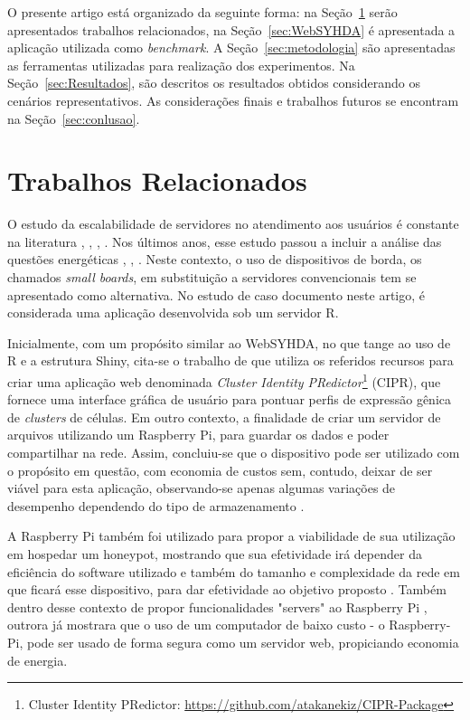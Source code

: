 \documentclass[12pt,english,brazil]{article}
\begin{document}
O presente artigo está organizado da seguinte forma: na Seção~\ref{sec:TrabalhosRelacionados} serão apresentados trabalhos relacionados, na Seção~\ref{sec:WebSYHDA} é apresentada a aplicação utilizada como \emph{benchmark}. A Seção~\ref{sec:metodologia} são apresentadas as ferramentas utilizadas para realização dos experimentos. Na Seção~\ref{sec:Resultados}, são descritos os resultados obtidos considerando os cenários representativos. As considerações finais e trabalhos futuros se encontram na Seção~\ref{sec:conlusao}.

\section{Trabalhos Relacionados} \label{sec:TrabalhosRelacionados}

O estudo da escalabilidade de servidores no atendimento aos usuários é constante na literatura \cite{generic1}, \cite{generic5}, \cite{generic3}, \cite{generic4}. Nos últimos anos, esse estudo passou a incluir a análise das questões
energéticas \cite{generic6}, \cite{generic7}, \cite{generic8}. Neste contexto, o uso de dispositivos de borda, os chamados \emph{small
boards}, em substituição a servidores convencionais tem se apresentado como alternativa. No estudo de caso documento neste artigo, é considerada uma aplicação desenvolvida sob um servidor R.

Inicialmente, com um propósito similar ao WebSYHDA, no que tange ao uso de R e a estrutura Shiny, cita-se o  trabalho de \cite{CIPR} que utiliza os referidos recursos para criar uma aplicação web denominada \emph{Cluster Identity PRedictor}\footnote{Cluster Identity PRedictor: \url{https://github.com/atakanekiz/CIPR-Package}} (CIPR), que fornece uma interface gráfica de usuário para pontuar perfis de expressão gênica de \emph{clusters} de células.
Em outro contexto, a finalidade de criar um servidor de arquivos utilizando um Raspberry Pi, para guardar os dados e poder compartilhar na rede. Assim, concluiu-se que o dispositivo pode ser utilizado com o propósito em questão, com economia de custos sem, contudo, deixar de ser viável para esta aplicação, observando-se apenas algumas variações de desempenho dependendo do tipo de armazenamento \cite{bruschi2016teste}.

A Raspberry Pi também foi utilizado para propor a viabilidade de sua utilização em hospedar um honeypot, mostrando que sua efetividade irá depender da eficiência do software utilizado e também do tamanho e complexidade da rede em que ficará esse dispositivo, para dar efetividade ao objetivo proposto \cite{honeypot}. Também dentro desse contexto de propor funcionalidades "servers" ao Raspberry Pi \cite{inproceedings}, outrora já mostrara que o uso de um computador de baixo custo - o Raspberry-Pi, pode ser usado de forma segura como um servidor web,  propiciando economia de energia.
\end{document}
